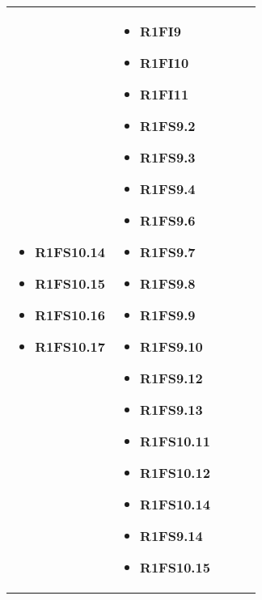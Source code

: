 {\begin{longtable}{C{2.5cm} C{3.2cm} C{2.8cm} C{2.8cm} C{2.8cm}}
\begin{itemize}
    \item[ ] \textbf{R1FS10.14}
    \item[ ] \textbf{R1FS10.15}
    \item[ ] \textbf{R1FS10.16}
    \item[ ] \textbf{R1FS10.17}
\end{itemize} & \begin{itemize}
    \item[ ] \textbf{R1FI9}
    \item[ ] \textbf{R1FI10}
    \item[ ] \textbf{R1FI11}
    \item[ ] \textbf{R1FS9.2}
    \item[ ] \textbf{R1FS9.3}
    \item[ ] \textbf{R1FS9.4}
    \item[ ] \textbf{R1FS9.6}
    \item[ ] \textbf{R1FS9.7}
    \item[ ] \textbf{R1FS9.8}
    \item[ ] \textbf{R1FS9.9}
    \item[ ] \textbf{R1FS9.10}
    \item[ ] \textbf{R1FS9.12}
    \item[ ] \textbf{R1FS9.13}
    \item[ ] \textbf{R1FS10.11}
    \item[ ] \textbf{R1FS10.12}
    \item[ ] \textbf{R1FS10.14}
    \item[ ] \textbf{R1FS9.14}
    \item[ ] \textbf{R1FS10.15}
\end{itemize}\\


\end{longtable}}
